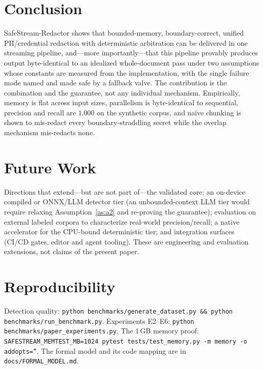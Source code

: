 \documentclass[conference]{IEEEtran}
\begin{document}
\section{Conclusion}

SafeStream-Redactor shows that bounded-memory, boundary-correct, unified
PII/credential redaction with deterministic arbitration can be delivered in one
streaming pipeline, and---more importantly---that this pipeline provably produces
output byte-identical to an idealized whole-document pass under two assumptions
whose constants are measured from the implementation, with the single failure mode
named and made safe by a fallback valve. The contribution is the combination and
the guarantee, not any individual mechanism. Empirically, memory is flat across
input sizes, parallelism is byte-identical to sequential, precision and recall are
$1.000$ on the synthetic corpus, and na\"ive chunking is shown to mis-redact every
boundary-straddling secret while the overlap mechanism mis-redacts none.

\section{Future Work}\label{sec:future}

Directions that extend---but are not part of---the validated core: an on-device
compiled or ONNX/LLM detector tier (an unbounded-context LLM tier would require
relaxing Assumption~\ref{as:a2} and re-proving the guarantee); evaluation on
external labeled corpora to characterize real-world precision/recall; a native
accelerator for the CPU-bound deterministic tier; and integration surfaces
(CI/CD gates, editor and agent tooling). These are engineering and evaluation
extensions, not claims of the present paper.

\section*{Reproducibility}

Detection quality: \texttt{python benchmarks/generate\_dataset.py \&\&
python benchmarks/run\_benchmark.py}. Experiments E2--E6:
\texttt{python benchmarks/paper\_experiments.py}. The $1$\,GB memory proof:
\texttt{SAFESTREAM\_MEMTEST\_MB=1024 pytest tests/test\_memory.py -m memory
-o addopts=''}. The formal model and its code mapping are in
\texttt{docs/FORMAL\_MODEL.md}.



\end{document}
